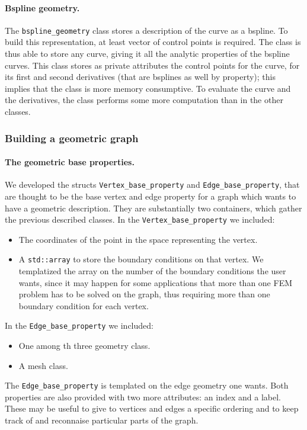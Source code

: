\documentclass[11pt]{article} %
\newcommand{\classname}[1]{\texttt{#1}}
\begin{document}
		\paragraph{Bspline geometry.} The \classname{bspline\_geometry} class stores a description of the curve as a bspline. To build this representation, at least vector of control points is required. The class is thus able to store any curve, giving it all the analytic properties of the bspline curves. This class stores as private attributes the control points for the curve, for its first and second derivatives (that are bsplines as well by property); this implies that the class is more memory consumptive. To evaluate the curve and the derivatives, the class performs some more computation than in the other classes.
		
		\subsubsection{Building a geometric graph}		
		\paragraph{The geometric base properties.} We developed the structs \classname{Vertex\_base\_property} and \classname{Edge\_base\_property}, that are thought to be the base vertex and edge property for a graph which wants to have a geometric description. They are substantially two containers, which gather the previous described classes.
		In the \classname{Vertex\_base\_property} we included:
		\begin{itemize}
			\item The coordinates of the point in the space representing the vertex.
			\item A \texttt{std::array} to store the boundary conditions on that vertex. We templatized the array on the number of the boundary conditions the user wants, since it may happen for some applications that more than one FEM problem has to be solved on the graph, thus requiring more than one boundary condition for each vertex.
		\end{itemize}
		In the \classname{Edge\_base\_property} we included:
		\begin{itemize}
			\item One among th three geometry class.
			\item A mesh class.
		\end{itemize}
		The \classname{Edge\_base\_property} is templated on the edge geometry one wants.
		Both properties are also provided with two more attributes: an index and a label. These may be useful to give to vertices and edges a specific ordering and to keep track of and reconnaise particular parts of the graph.
\end{document}
